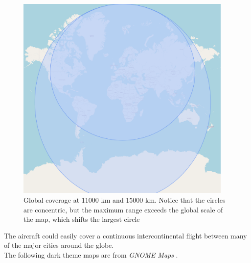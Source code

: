 \documentclass{article}
\begin{document}
\begin{figure}[h!]
    \centering
    \includegraphics[width=0.95\textwidth]{Sources/Plots_and_Pictures/OSM_radius.png}
    \caption{Global coverage at 11000 km and 15000 km. Notice that the circles are concentric,
    but the maximum range exceeds the global scale of the map, which shifts the largest circle}
    \label{Global_Coverage}
\end{figure}
\clearpage

The aircraft could easily cover a continuous intercontinental flight between many of the major cities around the globe.\\ 
The following dark theme maps are from \textit{GNOME Maps} \autocite{Gnome_maps}. 
\end{document}
